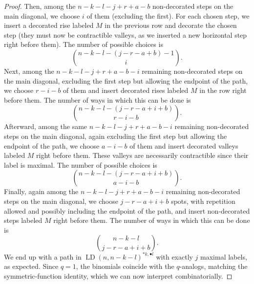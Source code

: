 \documentclass[reqno]{amsart}
\theoremstyle{plain}
\theoremstyle{definition}
\theoremstyle{remark}
\DeclareMathOperator{\LD}{LD}
\newcommand{\<}{\langle}
\renewcommand{\>}{\rangle}
\begin{document}
\begin{proof}
    Then, among the $n-k-l-j+r+a-b$ non-decorated steps on the main diagonal, we choose $i$ of them (excluding the first). For each chosen step, we insert a decorated rise labeled $M$ in the previous row and decorate the chosen step (they must now be contractible valleys, as we inserted a new horizontal step right before them). The number of possible choices is \[ \binom{n-k-l-(j-r-a+b)-1}{i}. \]
    Next, among the $n-k-l-j+r+a-b-i$ remaining non-decorated steps on the main diagonal, excluding the first step but allowing the endpoint of the path, we choose $r-i-b$ of them and insert decorated rises labeled $M$ in the row right before them. The number of ways in which this can be done is \[ \binom{n-k-l-(j-r-a+i+b)}{r-i-b}. \]
    Afterward, among the same $n-k-l-j+r+a-b-i$ remaining non-decorated steps on the main diagonal, again excluding the first step but allowing the endpoint of the path, we choose $a-i-b$ of them and insert decorated valleys labeled $M$ right before them. These valleys are necessarily contractible since their label is maximal. The number of possible choices is \[ \binom{n-k-l-(j-r-a+i+b)}{a-i-b}. \]
    Finally, again among the $n-k-l-j+r+a-b-i$ remaining non-decorated steps on the main diagonal, we choose $j-r-a+i+b$ spots, with repetition allowed and possibly including the endpoint of the path, and insert non-decorated steps labeled $M$ right before them. The number of ways in which this can be done is \[ \binom{n-k-l}{j-r-a+i+b}. \]
    We end up with a path in $\LD(n,n-k-l)^{\ast k, \bullet l}$ with exactly $j$ maximal labels, as expected. Since $q=1$, the binomials coincide with the $q$-analogs, matching the symmetric-function identity, which we can now interpret combinatorially.
\end{proof}
\end{document}
